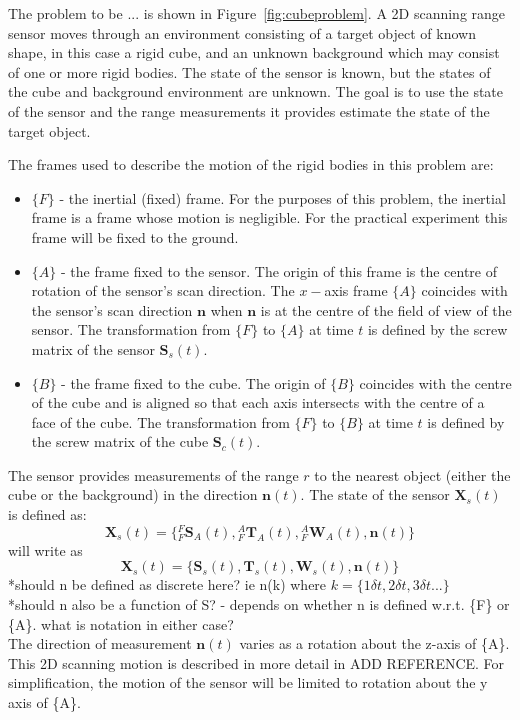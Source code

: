 The problem to be ... is shown in Figure~\ref{fig:cubeproblem}. A 2D scanning range sensor moves through an environment consisting of a target object of known shape, in this case a rigid cube, and an unknown background which may consist of one or more rigid bodies. The state of the sensor is known, but the states of the cube and background environment are unknown. The goal is to use the state of the sensor and the range measurements it provides estimate the state of the target object.

The frames used to describe the motion of the rigid bodies in this problem are:
\begin{itemize}
\item $\{F\}$ - the inertial (fixed) frame. For the purposes of this problem, the inertial frame is a frame whose motion is negligible. For the practical experiment this frame will be fixed to the ground.
\item $\{A\}$ - the frame fixed to the sensor. The origin of this frame is the centre of rotation of the sensor's scan direction. The $x-$axis frame $\{A\}$ coincides with the sensor's scan direction $\mathbf{n}$ when $\mathbf{n}$ is at the centre of the field of view of the sensor. The transformation from $\{F\}$ to $\{A\}$ at time $t$ is defined by the screw matrix of the sensor $\mathbf{S}_{s}(t)$.
\item $\{B\}$ - the frame fixed to the cube. The origin of $\{B\}$ coincides with the centre of the cube and is aligned so that each axis intersects with the centre of a face of the cube. The transformation from $\{F\}$ to $\{B\}$ at time $t$ is defined by the screw matrix of the cube $\mathbf{S}_{c}(t)$.
\end{itemize} 

The sensor provides measurements of the range $r$ to the nearest object (either the cube or the background) in the direction $\mathbf{n}(t)$. 
The state of the sensor $\mathbf{X}_{s}(t)$ is defined as:
\begin{equation}
	\mathbf{X}_{s}(t) = 
	\{{^{F}_{F}\mathbf{S}^{}_{A}(t)},{^{A}_{F}\mathbf{T}^{}_{A}(t)},{^{A}_{F}\mathbf{W}^{}_{A}(t)},
	\mathbf{n}(t)\}
\end{equation}
will write as 
\begin{equation}
	\mathbf{X}_{s}(t) = 
	\{\mathbf{S}_{s}(t),\mathbf{T}_{s}(t),\mathbf{W}_{s}(t),\mathbf{n}(t)\}
\end{equation}
*should n be defined as discrete here? ie n(k) where $k = \{1\delta t,2\delta t,3\delta t...\}$\\
*should n also be a function of S? - depends on whether n is defined w.r.t. \{F\} or \{A\}. what is notation in either case?\\
The direction of measurement $\mathbf{n}(t)$ varies as a rotation about the z-axis of \{A\}. This 2D scanning motion is described in more detail in ADD REFERENCE. For simplification, the motion of the sensor will be limited to rotation about the y axis of \{A\}.


